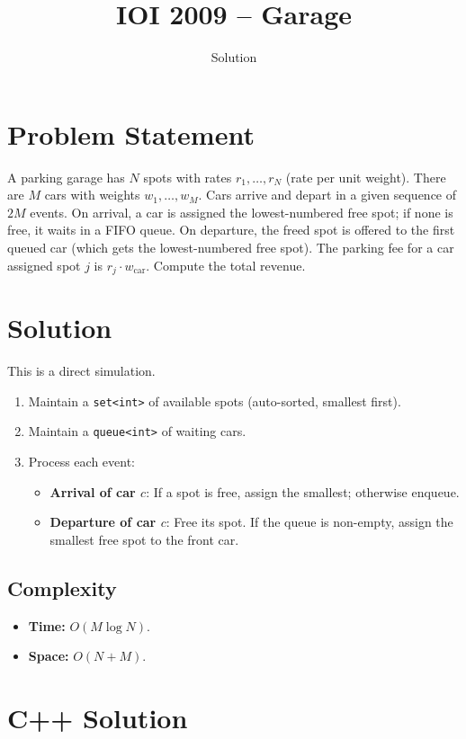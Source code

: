 \documentclass[11pt,a4paper]{article}
\title{IOI 2009 -- Garage}
\author{Solution}
\date{}
\begin{document}
\maketitle

\section{Problem Statement}
A parking garage has $N$ spots with rates $r_1, \ldots, r_N$ (rate per unit weight). There are $M$ cars with weights $w_1, \ldots, w_M$. Cars arrive and depart in a given sequence of $2M$ events. On arrival, a car is assigned the lowest-numbered free spot; if none is free, it waits in a FIFO queue. On departure, the freed spot is offered to the first queued car (which gets the lowest-numbered free spot). The parking fee for a car assigned spot $j$ is $r_j \cdot w_{\text{car}}$. Compute the total revenue.

\section{Solution}
This is a direct simulation.
\begin{enumerate}
    \item Maintain a \texttt{set<int>} of available spots (auto-sorted, smallest first).
    \item Maintain a \texttt{queue<int>} of waiting cars.
    \item Process each event:
    \begin{itemize}
        \item \textbf{Arrival of car $c$}: If a spot is free, assign the smallest; otherwise enqueue.
        \item \textbf{Departure of car $c$}: Free its spot. If the queue is non-empty, assign the smallest free spot to the front car.
    \end{itemize}
\end{enumerate}

\subsection{Complexity}
\begin{itemize}
    \item \textbf{Time:} $O(M \log N)$.
    \item \textbf{Space:} $O(N + M)$.
\end{itemize}

\section{C++ Solution}
\end{document}
